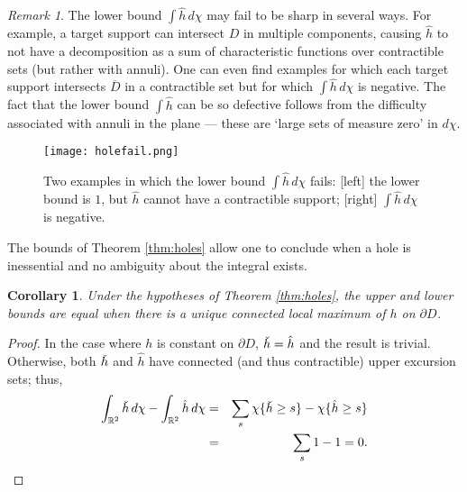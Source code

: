 \documentclass{psapm-l}
\newtheorem{corollary}[theorem]{Corollary}
\theoremstyle{definition}
\theoremstyle{remark}
\newtheorem{remark}[theorem]{Remark}
\numberwithin{equation}{section}
\begin{document}
\begin{remark}
\label{rem:sharpness}
The lower bound $\int\hat{h}\,d\chi$ may fail to be sharp in several ways. For example, a target support can intersect $D$ in multiple components, causing $\hat{h}$ to not have a decomposition as a sum of characteristic functions over contractible sets (but rather with annuli). One can even find examples for which each target support intersects $\overline{D}$ in a contractible set but for which $\int\hat{h}\,d\chi$ is negative. The fact that the lower bound $\int\hat{h}$ can be so defective follows from the difficulty associated with annuli in the plane --- these are `large sets of measure zero' in $d\chi$.
\end{remark}

\begin{figure}[hbt]
\begin{center}
\texttt{[image: holefail.png]}
\caption{Two examples in which the lower bound $\int\hat{h}\,d\chi$ fails: [left] the lower bound is $1$, but $\hat{h}$ cannot have a contractible support; [right] $\int\hat{h}\,d\chi$ is negative.}
\label{fig:holefail}
\end{center}
\end{figure}

The bounds of Theorem \ref{thm:holes} allow one to conclude when a hole is inessential and no ambiguity about the integral exists.

\begin{corollary}
\label{cor:tight}
Under the hypotheses of Theorem \ref{thm:holes}, the upper and lower bounds are equal when there is a unique connected local maximum of $h$ on $\partial D$.
\end{corollary}
\begin{proof}
In the case where $h$ is constant on $\partial D$, ${\rlap{\smash{\raisebox{2.25ex}{{\raisebox{1ex}{\rotatebox{180}{{$\hat{~}\,$}}}}}}}{h}}=\hat{h}$ and the result is trivial. Otherwise, both ${\rlap{\smash{\raisebox{2.25ex}{{\raisebox{1ex}{\rotatebox{180}{{$\hat{~}\,$}}}}}}}{h}}$ and $\hat{h}$ have connected (and thus contractible) upper excursion sets; thus,
\begin{eqnarray*}
\label{eq:diff}
    \int_{{{\mathbb R}}^2} {\rlap{\smash{\raisebox{2.25ex}{{\raisebox{1ex}{\rotatebox{180}{{$\hat{~}\,$}}}}}}}{h}}\, d\chi
    -
    \int_{{{\mathbb R}}^2} \hat{h}\, d\chi
    &=&
    \sum_s \chi\{{\rlap{\smash{\raisebox{2.25ex}{{\raisebox{1ex}{\rotatebox{180}{{$\hat{~}\,$}}}}}}}{h}}\geq s\} - \chi\{\hat{h}\geq s\}
    \\
    &=&
    \sum_s 1-1 = 0 .
\end{eqnarray*}
\end{proof}
\end{document}
